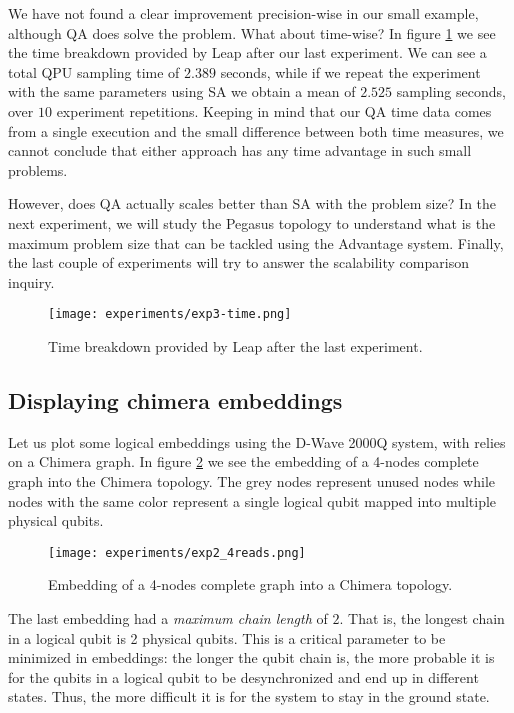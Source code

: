 We have not found a clear improvement precision-wise in our small example, although QA does solve the problem. What about time-wise? In figure \ref{fig:exp3-time} we see the time breakdown provided by Leap after our last experiment. We can see a total QPU sampling time of $2.389$ seconds, while if we repeat the experiment with the same parameters using SA we obtain a mean of $2.525$ sampling seconds, over $10$ experiment repetitions. Keeping in mind that our QA time data comes from a single execution and the small difference between both time measures, we cannot conclude that either approach has any time advantage in such small problems.

However, does QA actually scales better than SA with the problem size? In the next experiment, we will study the Pegasus topology to understand what is the maximum problem size that can be tackled using the Advantage system. Finally, the last couple of experiments will try to answer the scalability comparison inquiry.

\begin{figure}[h]
	\texttt{[image: experiments/exp3-time.png]}
	\centering
	\caption{Time breakdown provided by Leap after the last experiment.}
	\label{fig:exp3-time}
\end{figure}


\subsection{Displaying chimera embeddings}


Let us plot some logical embeddings using the D-Wave 2000Q system, with relies on a Chimera graph. In figure \ref{fig:exp2_4reads} we see the embedding of a 4-nodes complete graph into the Chimera topology. The grey nodes represent unused nodes while nodes with the same color represent a single logical qubit mapped into multiple physical qubits.

\begin{figure}[h]
	\texttt{[image: experiments/exp2\_4reads.png]}
	\centering
	\caption{Embedding of a 4-nodes complete graph into a Chimera topology.}
	\label{fig:exp2_4reads}
\end{figure}

The last embedding had a \emph{maximum chain length} of $2$. That is, the longest chain in a logical qubit is 2 physical qubits. This is a critical parameter to be minimized in embeddings: the longer the qubit chain is, the more probable it is for the qubits in a logical qubit to be desynchronized and end up in different states. Thus, the more difficult it is for the system to stay in the ground state.

